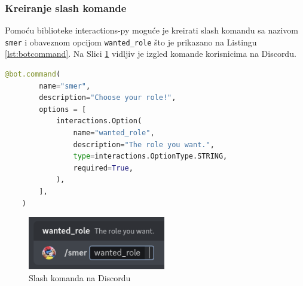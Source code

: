 \documentclass[a4paper,11pt]{article}
\begin{document}
\subsubsection{Kreiranje slash komande}
Pomoću biblioteke interactions-py moguće je kreirati slash komandu sa nazivom \texttt{smer} i obaveznom opcijom \texttt{wanted\_role} što je prikazano na Listingu \ref{lst:botcommand}. Na Slici \ref{fig:slashcommand} vidljiv je izgled komande korisnicima na Discordu.
\begin{lstlisting}[language=Python, caption=Kreiranje slash komande, label=lst:botcommand]
    @bot.command(
        name="smer",
        description="Choose your role!",
        options = [
            interactions.Option(
                name="wanted_role",
                description="The role you want.",
                type=interactions.OptionType.STRING,
                required=True,
            ),
        ],
    )
\end{lstlisting}
\begin{figure}[!htb]
    \centering
    \includegraphics[width=6cm]{slashcommand}
    \caption{Slash komanda na Discordu}
    \label{fig:slashcommand}
\end{figure}
\newpage
\end{document}
